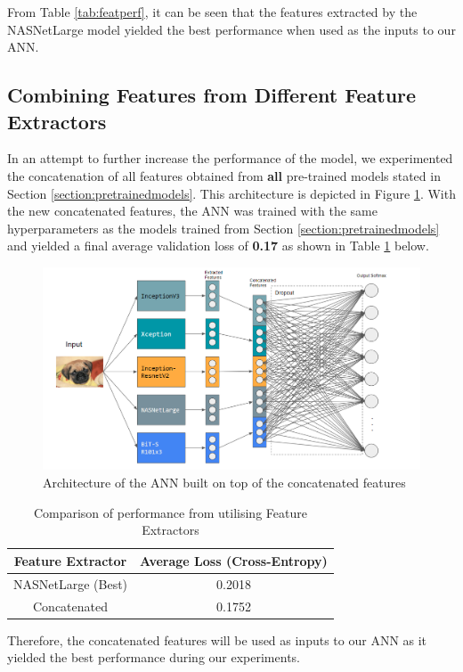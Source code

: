 \documentclass[sigconf,nonacm=true]{acmart}
\begin{document}
From Table \ref{tab:featperf}, it can be seen that the features extracted by the NASNetLarge model yielded the 
best performance when used as the inputs to our ANN. 


\subsection{Combining Features from Different Feature Extractors}
In an attempt to further increase the performance of the model, we experimented the concatenation of all features
obtained from \textbf{all} pre-trained models stated in Section \ref{section:pretrainedmodels}. This architecture is depicted
in Figure \ref{fig:finalarch}. With the new concatenated features, the ANN was trained with the same hyperparameters as the 
models trained from Section \ref{section:pretrainedmodels} and yielded a final average validation loss
of \textbf{0.17} as shown in Table \ref{tab:featperf2} below.

\begin{figure}
	\centering
	\includegraphics[width=0.95\linewidth]{fig/finalarch.png}
	\caption{Architecture of the ANN built on top of the concatenated features}
	\label{fig:finalarch}
\end{figure} 


\begin{table}[H]
	\begin{tabular}{cc}
		\toprule
		Feature Extractor&Average Loss (Cross-Entropy)\\
		\midrule
		NASNetLarge (Best)& 0.2018\\
		Concatenated & 0.1752\\
		\bottomrule
	\end{tabular}
	\caption{Comparison of performance from utilising Feature Extractors}
	\label{tab:featperf2}
\end{table}
Therefore, the concatenated features will be used as inputs to our ANN as it yielded the 
best performance during our experiments.
\end{document}
